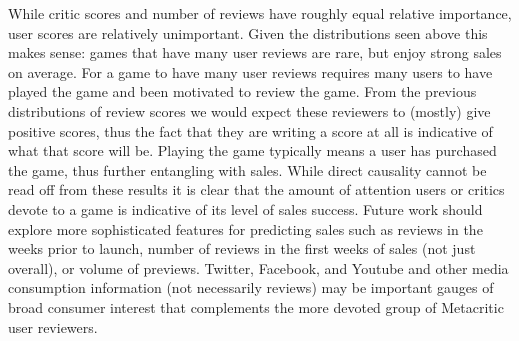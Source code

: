 \documentclass[letterpaper]{article}
\begin{document}
While critic scores and number of reviews have roughly equal relative importance, user scores are relatively unimportant. Given the distributions seen above this makes sense: games that have many user reviews are rare, but enjoy strong sales on average. For a game to have many user reviews requires many users to have played the game and been motivated to review the game. From the previous distributions of review scores we would expect these reviewers to (mostly) give positive scores, thus the fact that they are writing a score at all is indicative of what that score will be. Playing the game typically means a user has purchased the game, thus further entangling with sales. While direct causality cannot be read off from these results it is clear that the amount of attention users or critics devote to a game is indicative of its level of sales success. Future work should explore more sophisticated features for predicting sales such as reviews in the weeks prior to launch, number of reviews in the first weeks of sales (not just overall), or volume of previews. Twitter, Facebook, and Youtube and other media consumption information (not necessarily reviews) may be important gauges of broad consumer interest that complements the more devoted group of Metacritic user reviewers.
\end{document}

